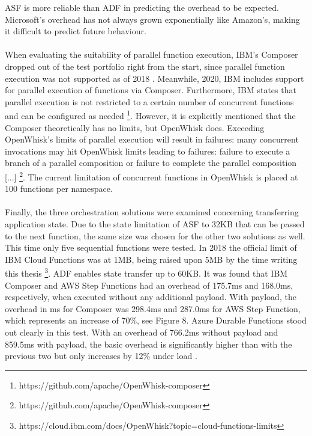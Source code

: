 \documentclass[a4paper,11pt, pagesize]{scrartcl}
\begin{document}
\begin{spacing}{1.2}
ASF is more reliable than ADF in predicting the overhead to be expected. Microsoft's overhead has not always grown exponentially like Amazon's, making it difficult to predict future behaviour.\\\\ When evaluating the suitability of parallel function execution, IBM's Composer dropped out of the test portfolio right from the start, since parallel function execution was not supported as of 2018 \cite{lopez2018comparison}. Meanwhile, 2020, IBM includes support for parallel execution of functions via Composer. Furthermore, IBM states that parallel execution is not restricted to a certain number of concurrent functions and can be configured as needed \footnote{https://github.com/apache/OpenWhisk-composer }. However, it is explicitly mentioned that the Composer theoretically has no limits, but OpenWhisk does. Exceeding OpenWhisk's limits of parallel execution will result in failures: \glqq[...] many concurrent invocations may hit OpenWhisk limits leading to failures: failure to execute a branch of a parallel composition or failure to complete the parallel composition [...]\grqq{} \footnote{https://github.com/apache/OpenWhisk-composer}. The current limitation of concurrent functions in OpenWhisk is placed at 100 functions per namespace.\\\\ Finally, the three orchestration solutions were examined concerning transferring application state. Due to the state limitation of ASF to 32KB that can be passed to the next function, the same size was chosen for the other two solutions as well. This time only five sequential functions were tested. In 2018 the official limit of IBM Cloud Functions was at 1MB, being raised upon 5MB by the time writing this thesis \footnote{https://cloud.ibm.com/docs/OpenWhisk?topic=cloud-functions-limits}. ADF enables state transfer up to 60KB. It was found that IBM Composer and AWS Step Functions had an overhead of 175.7ms and 168.0ms, respectively,  when executed without any additional payload. With payload, the overhead in ms for Composer was 298.4ms and 287.0ms for AWS Step Function, which represents an increase of 70\%, see Figure 8. Azure Durable Functions stood out clearly in this test. With an overhead of 766.2ms without payload and 859.5ms with payload, the basic overhead is significantly higher than with the previous two but only increases by 12\% under load \cite{lopez2018comparison}.
\begin{figure}[H]
\label{fig:orchestration}
\centering

\end{figure}
\end{spacing}
\end{document}
